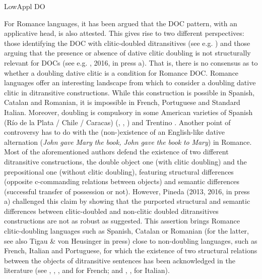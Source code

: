 \documentclass[output=paper,modfonts,nonflat]{langsci/langscibook}
\begin{document}
\begin{styleBodyA}
       LowAppl       DO
\end{styleBodyA}

\begin{styleListNumberi}
For Romance languages, it has been argued that the DOC pattern, with an applicative head, is also attested. This gives rise to two different perspectives: those identifying the DOC with clitic-doubled ditransitives (see e.g. \citealt{Cuervo2003}) and those arguing that the presence or absence of dative clitic doubling is not structurally relevant for DOCs (see e.g. \citealt{Pineda2013}, 2016, in press a). That is, there is no consensus as to whether a doubling dative clitic is a  condition for Romance DOC. Romance languages offer an interesting landscape from which to consider a doubling dative clitic in ditransitive constructions. While this construction is possible in Spanish, Catalan and Romanian, it is impossible in French, Portuguese and Standard Italian. Moreover, doubling is compulsory in some American varieties of Spanish (Río de la Plata / Chile / Caracas) (\citealt{Parodi1998}, \citealt{Senn2008}, \citealt{Pujalte2009}) and Trentino \citep{Cordin1993}. Another point of controversy has to do with the (non-)existence of an English-like dative alternation (\textit{John} \textit{gave} \textit{Mary} \textit{the} \textit{book,} \textit{John} \textit{gave} \textit{the} \textit{book} \textit{to} \textit{Mary}) in Romance. Most of the aforementioned authors defend the existence of two different ditransitive constructions, the double object one (with clitic doubling) and the prepositional one (without clitic doubling), featuring structural differences (opposite c-commanding relations between objects) and semantic differences (successful transfer of possession or not). However, Pineda (2013, 2016, in press a) challenged this claim by showing that the purported structural and semantic differences between clitic-doubled and non-clitic doubled ditransitives constructions are not as robust as suggested. This assertion brings Romance clitic-doubling languages such as Spanish, Catalan or Romanian (for the latter, see also Tigau \& von Heusinger in press) close to non-doubling languages, such as French, Italian and Portuguese, for which the existence of two structural relations between the objects of ditransitive sentences has been acknowledged in the literature (see \citealt{Harley2002}, \citealt{Anagnostopoulou2003}, \citealt{Fournier2010}, and \citealt{BonehNash2011} for French; and \citealt{GiorgiLongobardi1991}, \citealt{McGinnis2001}, \citealt{Harley2002} for Italian). 
\end{styleListNumberi}
\end{document}
